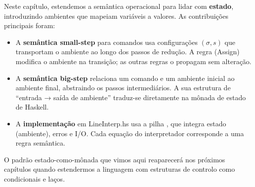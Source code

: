 Neste capítulo, estendemos a semântica operacional para lidar com
\textbf{estado}, introduzindo ambientes que mapeiam variáveis a
valores. As contribuições principais foram:

\begin{itemize}
  \item
    A \textbf{semântica small-step} para comandos usa configurações
    \((\sigma, s)\) que transportam o ambiente ao longo dos passos de
    redução. A regra (Assign) modifica o ambiente na transição; as
    outras regras o propagam sem alteração.
  \item
    A \textbf{semântica big-step} relaciona um comando e um ambiente
    inicial ao ambiente final, abstraindo os passos intermediários. A
    sua estrutura de ``entrada → saída de ambiente'' traduz-se
    diretamente na mônada de estado de Haskell.
  \item
    A \textbf{implementação} em
    LineInterp.hs usa a pilha
    , que
    integra estado (ambiente), erros e I/O. Cada equação do
    interpretador corresponde a uma regra semântica.
\end{itemize}

O padrão estado-como-mônada que vimos aqui reaparecerá nos próximos
capítulos quando estendermos a linguagem com estruturas de controlo
como condicionais e laços.

